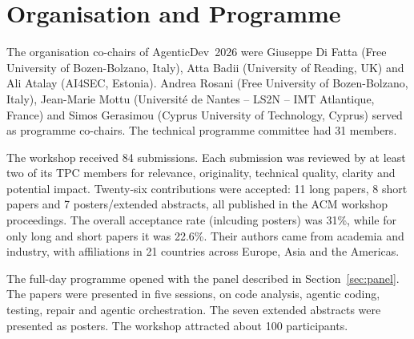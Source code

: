 \section{Organisation and Programme}
\label{sec:workshop}

The organisation co-chairs of AgenticDev~2026 were Giuseppe Di Fatta (Free University of Bozen-Bolzano, Italy), Atta Badii (University of Reading, UK) and Ali Atalay (AI4SEC, Estonia). Andrea Rosani (Free University of Bozen-Bolzano, Italy), Jean-Marie Mottu (Universit\'e de Nantes -- LS2N -- IMT Atlantique, France) and Simos Gerasimou (Cyprus University of Technology, Cyprus) served as programme co-chairs. The technical programme committee had 31 members.

The workshop received 84 submissions. 
Each submission was reviewed by at least two of its TPC members for relevance, originality, technical quality, clarity and potential impact. Twenty-six contributions were accepted: 11 long papers, 8 short papers and 7 posters/extended abstracts, all published in the ACM workshop proceedings. The overall acceptance rate (inlcuding posters) was 31\%, while for only long and short papers it was 22.6\%.
Their authors came from academia and industry, with affiliations in 21 countries across Europe, Asia and the Americas.

The full-day programme opened with the panel described in Section~\ref{sec:panel}. The papers were presented in five sessions, on code analysis, agentic coding, testing, repair and agentic orchestration. The seven extended abstracts were presented as posters. The workshop attracted about 100 participants.
